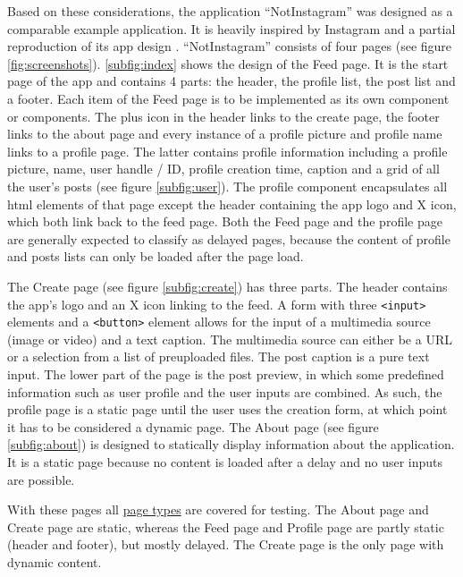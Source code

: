 \documentclass[a4paper, 12pt]{article}
\begin{document}
Based on these considerations, the application \enquote{NotInstagram} was designed as a comparable example application.
It is heavily inspired by Instagram and a partial reproduction of its app design \citep{instagram}.
\enquote{NotInstagram} consists of four pages (see figure \ref{fig:screenshots}).
\ref{subfig:index} shows the design of the Feed page.
It is the start page of the app and contains 4 parts: the header, the profile list, the post list and a footer.
Each item of the Feed page is to be implemented as its own component or components.
The plus icon in the header links to the create page, the footer links to the about page and every instance of a profile picture and profile name links to a profile page.
The latter contains profile information including a profile picture, name, user handle / ID, profile creation time, caption and a grid of all the user's posts (see figure \ref{subfig:user}).
The profile component encapsulates all \acrshort{html} elements of that page except the header containing the app logo and X icon, which both link back to the feed page.
Both the Feed page and the profile page are generally expected to classify as delayed pages, because the content of profile and posts lists can only be loaded after the page load.

The Create page (see figure \ref{subfig:create}) has three parts.
The header contains the app's logo and an X icon linking to the feed.
A form with three \verb|<input>| elements and a \verb|<button>| element allows for the input of a multimedia source (image or video) and a text caption.
The multimedia source can either be a URL or a selection from a list of preuploaded files.
The post caption is a pure text input.
The lower part of the page is the post preview, in which some predefined information such as user profile and the user inputs are combined.
As such, the profile page is a static page until the user uses the creation form, at which point it has to be considered a dynamic page.
The About page (see figure \ref{subfig:about}) is designed to statically display information about the application.
It is a static page because no content is loaded after a delay and no user inputs are possible.

With these pages all \hyperref[enum:pagetypes]{page types} are covered for testing.
The About page and Create page are static, whereas the Feed page and Profile page are partly static (header and footer), but mostly delayed.
The Create page is the only page with dynamic content.
\end{document}
